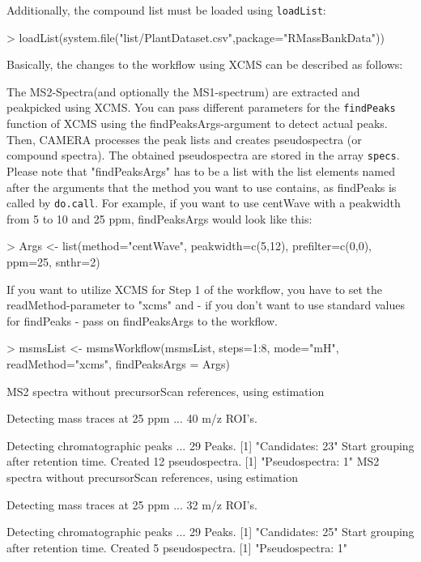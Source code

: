 \documentclass[letterpaper, 11pt]{article}
\newcommand{\Rfunction}[1]{{\texttt{#1}}}
\newcommand{\Rvar}[1]{{\texttt{#1}}}
\begin{document}
Additionally, the compound list must be loaded using \Rfunction{loadList}:

\begin{Schunk}
\begin{Sinput}
> loadList(system.file("list/PlantDataset.csv",package="RMassBankData"))
\end{Sinput}
\end{Schunk}

Basically, the changes to the workflow using XCMS can be described as follows:

The MS2-Spectra(and optionally the MS1-spectrum) are extracted and peakpicked using XCMS. You can pass different parameters for the \Rfunction{findPeaks} function of XCMS using the findPeaksArgs-argument to detect actual peaks. Then, CAMERA processes the peak lists and creates pseudospectra (or compound spectra). The obtained pseudospectra are stored in the array \Rvar{specs}.
Please note that "findPeaksArgs" has to be a list with the list elements named after the arguments that the method you want to use contains, as findPeaks is called by \Rfunction{do.call}.
For example, if you want to use centWave with a peakwidth from 5 to 10 and 25 ppm, findPeaksArgs would look like this:

\begin{Schunk}
\begin{Sinput}
> 	Args <- list(method="centWave", peakwidth=c(5,12), prefilter=c(0,0), ppm=25, snthr=2)
\end{Sinput}
\end{Schunk}

If you want to utilize XCMS for Step 1 of the workflow, you have to set the readMethod-parameter to "xcms" and - if you don't want to use standard values for findPeaks - pass on findPeaksArgs to the workflow.

\begin{Schunk}
\begin{Sinput}
> 	msmsList <- msmsWorkflow(msmsList, steps=1:8, mode="mH", readMethod="xcms", findPeaksArgs = Args)
\end{Sinput}
\begin{Soutput}
MS2 spectra without precursorScan references, using estimation

 Detecting mass traces at 25 ppm ... 
 % finished: 10 20 30 40 50 60 70 80 90 100 
 40 m/z ROI's.

 Detecting chromatographic peaks ... 
 % finished: 10 20 30 40 50 60 70 80 90 100 
 29  Peaks.
[1] "Candidates: 23"
Start grouping after retention time.
Created 12 pseudospectra.
[1] "Pseudospectra: 1"
MS2 spectra without precursorScan references, using estimation

 Detecting mass traces at 25 ppm ... 
 % finished: 10 20 30 40 50 60 70 80 90 100 
 32 m/z ROI's.

 Detecting chromatographic peaks ... 
 % finished: 50 100 
 29  Peaks.
[1] "Candidates: 25"
Start grouping after retention time.
Created 5 pseudospectra.
[1] "Pseudospectra: 1"
\end{Soutput}
\end{Schunk}
\end{document}
